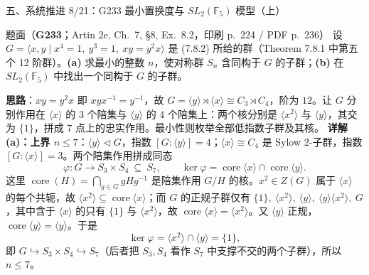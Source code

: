 \documentclass[aspectratio=169,10pt,fontset=none]{ctexbeamer}
\newcommand{\ex}[1]{\textcolor{accent}{\footnotesize\bfseries #1}}
\newcommand{\key}[1]{\textcolor{ink}{\bfseries #1}}
\begin{document}
\begin{frame}[t]{五、系统推进 8/21：G233 最小置换度与 $SL_2(\mathbb F_5)$ 模型（上）}
\label{ex:G233}
\scriptsize
\begin{block}{\footnotesize 题面（\ex{G233}；Artin 2e, Ch.~7, §8, Ex.~8.2，印刷 p.~224 / PDF p.~236）}
设 $G=\langle x,y\mid x^4=1,\ y^3=1,\ xy=y^2x\rangle$ 是 (7.8.2) 所给的群（Theorem 7.8.1 中第五个 12 阶群）。\textbf{(a)} 求最小的整数 $n$，使对称群 $S_n$ 含同构于 $G$ 的子群；\textbf{(b)} 在 $SL_2(\mathbb F_5)$ 中找出一个同构于 $G$ 的子群。
\end{block}
\key{思路}：$xy=y^2x$ 即 $xyx^{-1}=y^{-1}$，故 $G=\langle y\rangle\rtimes\langle x\rangle\cong C_3\rtimes C_4$，阶为 $12$。让 $G$ 分别作用在 $\langle x\rangle$ 的 $3$ 个陪集与 $\langle y\rangle$ 的 $4$ 个陪集上：两个核分别是 $\langle x^2\rangle$ 与 $\langle y\rangle$，其交为 $\{1\}$，拼成 $7$ 点上的忠实作用。最小性则枚举全部低指数子群及其核。
\key{详解 (a)：上界 $n\le 7$}：$\langle y\rangle\triangleleft G$，指数 $[G:\langle y\rangle]=4$；$\langle x\rangle\cong C_4$ 是 Sylow $2$-子群，指数 $[G:\langle x\rangle]=3$。两个陪集作用拼成同态
\[ \varphi:G\longrightarrow S_3\times S_4\ \subseteq\ S_7,\qquad
   \ker\varphi=\operatorname{core}\langle x\rangle\cap\operatorname{core}\langle y\rangle . \]
这里 $\operatorname{core}(H)=\bigcap_{g\in G}gHg^{-1}$ 是陪集作用 $G/H$ 的核。$x^2\in Z(G)$ 属于 $\langle x\rangle$ 的每个共轭，故 $\langle x^2\rangle\subseteq\operatorname{core}\langle x\rangle$；而 $G$ 的正规子群仅有 $\{1\},\ \langle x^2\rangle,\ \langle y\rangle,\ \langle y\rangle\langle x^2\rangle,\ G$，其中含于 $\langle x\rangle$ 的只有 $\{1\}$ 与 $\langle x^2\rangle$，故 $\operatorname{core}\langle x\rangle=\langle x^2\rangle$。又 $\langle y\rangle$ 正规，$\operatorname{core}\langle y\rangle=\langle y\rangle$。于是
\[ \ker\varphi=\langle x^2\rangle\cap\langle y\rangle=\{1\}, \]
即 $G\hookrightarrow S_3\times S_4\hookrightarrow S_7$（后者把 $S_3,S_4$ 看作 $S_7$ 中支撑不交的两个子群），所以 $n\le 7$。
\end{frame}
\end{document}
